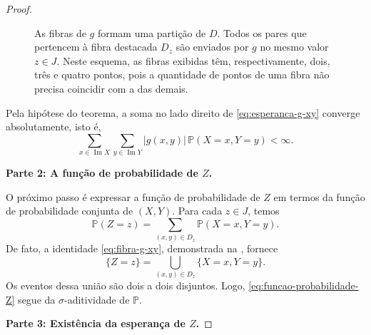 \documentclass[12pt,portuguese]{article}
\theoremstyle{definition}
\begin{document}
\begin{proof}
\begin{figure}[H]
\caption{As fibras de $g$ formam uma partição de $D$. Todos os pares que
pertencem à fibra destacada $D_z$ são enviados por $g$ no mesmo valor
$z\in J$. Neste esquema, as fibras exibidas têm, respectivamente, dois,
três e quatro pontos, pois a quantidade de pontos de uma fibra não precisa
coincidir com a das demais.}
\label{fig:fibras-g-particao-D}
\end{figure}

Pela hipótese do teorema, a soma no lado direito de
\eqref{eq:esperanca-g-xy} converge absolutamente, isto é,
\begin{equation}\label{eq:conv-abs-g-xy}
  \sum_{x\in\operatorname{Im}X}
  \sum_{y\in\operatorname{Im}Y}
  |g(x,y)|\,\mathbb{P}(X=x,Y=y)
  <\infty.
\end{equation}

\medskip
\noindent\textbf{Parte 2: A função de probabilidade de $Z$.}

O próximo passo é expressar a função de probabilidade de $Z$ em termos da
função de probabilidade conjunta de $(X,Y)$. Para cada $z\in J$, temos
\begin{equation}\label{eq:funcao-probabilidade-Z}
  \mathbb{P}(Z=z)
  =\sum_{(x,y)\in D_z}\mathbb{P}(X=x,Y=y).
\end{equation}
De fato, a identidade \eqref{eq:fibra-g-xy}, demonstrada na
, fornece
\[
  \{Z=z\}=\bigcup_{(x,y)\in D_z}\{X=x,Y=y\}.
\]
Os eventos dessa união são dois a dois disjuntos. Logo,
\eqref{eq:funcao-probabilidade-Z} segue da $\sigma$-aditividade de
$\mathbb{P}$.

\medskip
\noindent\textbf{Parte 3: Existência da esperança de $Z$.}


\end{proof}
\end{document}
